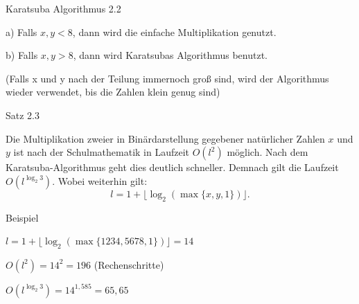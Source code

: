 \documentclass[10pt]{beamer}
\begin{document}
\begin{frame}{Karatsuba Algorithmus 2.2}



\end{frame}


\begin{frame}
    a) Falls $x, y < 8$, dann wird die einfache Multiplikation genutzt.


b) Falls $x, y > 8$, dann wird Karatsubas Algorithmus benutzt.


\vspace{0.5cm}

(Falls x und y nach der Teilung immernoch groß sind, wird der Algorithmus wieder verwendet, bis die Zahlen klein genug sind)

\end{frame}


\begin{frame}{Satz 2.3}

Die Multiplikation zweier in Binärdarstellung gegebener natürlicher Zahlen $x$ und $y$ ist nach der Schulmathematik in Laufzeit $O(l^2)$ möglich. Nach dem Karatsuba-Algorithmus geht dies deutlich schneller. Demnach gilt die Laufzeit $O\left(l^{\log_2 3}\right)$. Wobei weiterhin gilt:
\[
l = 1 + \lfloor \log_2(\max\{x, y, 1\}) \rfloor.
\]
    
\end{frame}

\begin{frame}{Beispiel}

$l = 1 + \lfloor \log_2(\max\{1234, 5678, 1\}) \rfloor = 14$

 $O(l^2)=14^2= 196$ (Rechenschritte)
 
 $O\left(l^{\log_2 3}\right)= 14^{1,585}= 65,65$

    
\end{frame}
\end{document}
